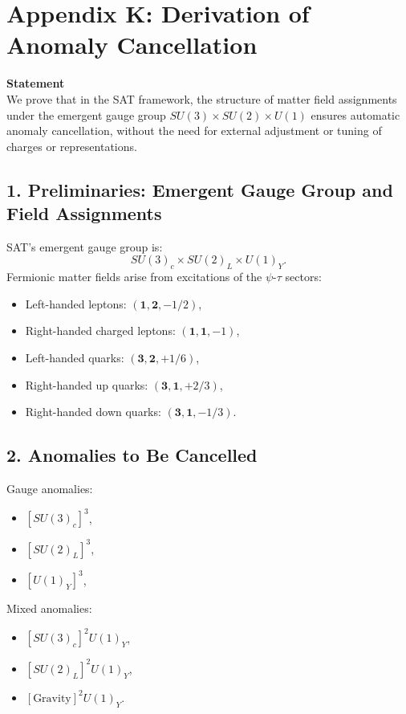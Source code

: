 \documentclass[12pt]{article}
\begin{document}
\newpage
\section*{Appendix K: Derivation of Anomaly Cancellation}

\textbf{Statement} \\
We prove that in the SAT framework, the structure of matter field assignments under the emergent gauge group \(SU(3) \times SU(2) \times U(1)\) ensures automatic anomaly cancellation, without the need for external adjustment or tuning of charges or representations.

\subsection*{1. Preliminaries: Emergent Gauge Group and Field Assignments}
SAT’s emergent gauge group is:
\[
SU(3)_c \times SU(2)_L \times U(1)_Y.
\]
Fermionic matter fields arise from excitations of the \(\psi\)-\(\tau\) sectors:
\begin{itemize}
    \item Left-handed leptons: \((\mathbf{1}, \mathbf{2}, -1/2)\),
    \item Right-handed charged leptons: \((\mathbf{1}, \mathbf{1}, -1)\),
    \item Left-handed quarks: \((\mathbf{3}, \mathbf{2}, +1/6)\),
    \item Right-handed up quarks: \((\mathbf{3}, \mathbf{1}, +2/3)\),
    \item Right-handed down quarks: \((\mathbf{3}, \mathbf{1}, -1/3)\).
\end{itemize}

\subsection*{2. Anomalies to Be Cancelled}
Gauge anomalies:
\begin{itemize}
    \item \([SU(3)_c]^3\),
    \item \([SU(2)_L]^3\),
    \item \([U(1)_Y]^3\),
\end{itemize}
Mixed anomalies:
\begin{itemize}
    \item \([SU(3)_c]^2 U(1)_Y\),
    \item \([SU(2)_L]^2 U(1)_Y\),
    \item \([\text{Gravity}]^2 U(1)_Y\).
\end{itemize}
\end{document}
